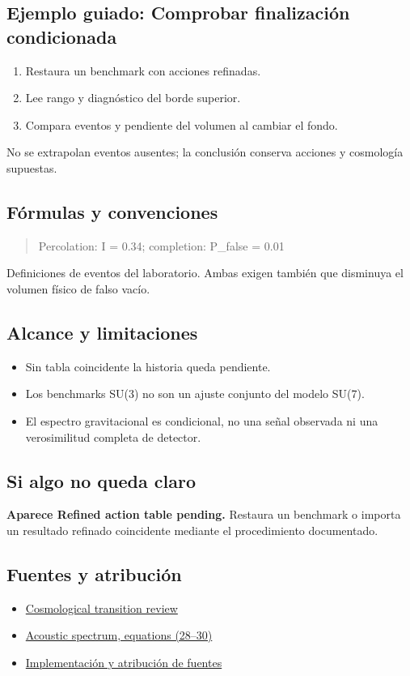 \documentclass[11pt,a4paper]{article}
\begin{document}
\subsection*{Ejemplo guiado: Comprobar finalización condicionada}
\begin{enumerate}
\item Restaura un benchmark con acciones refinadas.
\item Lee rango y diagnóstico del borde superior.
\item Compara eventos y pendiente del volumen al cambiar el fondo.
\end{enumerate}
No se extrapolan eventos ausentes; la conclusión conserva acciones y cosmología supuestas.
\subsection*{Fórmulas y convenciones}
\begin{quote}Percolation: I = 0.34; completion: P\_false = 0.01\end{quote}
Definiciones de eventos del laboratorio. Ambas exigen también que disminuya el volumen físico de falso vacío.

\subsection*{Alcance y limitaciones}
\begin{itemize}
\item Sin tabla coincidente la historia queda pendiente.
\item Los benchmarks SU(3) no son un ajuste conjunto del modelo SU(7).
\item El espectro gravitacional es condicional, no una señal observada ni una verosimilitud completa de detector.
\end{itemize}
\subsection*{Si algo no queda claro}
\textbf{Aparece Refined action table pending.} Restaura un benchmark o importa un resultado refinado coincidente mediante el procedimiento documentado.

\subsection*{Fuentes y atribución}
\begin{itemize}
\item \href{https://arxiv.org/abs/2305.02357}{Cosmological transition review}
\item \href{https://arxiv.org/abs/2309.05474}{Acoustic spectrum, equations (28--30)}
\item \href{https://github.com/karlesmarin/ghu-lab/blob/main/src/modules/thermal_history.mjs}{Implementación y atribución de fuentes}
\end{itemize}
\end{document}
